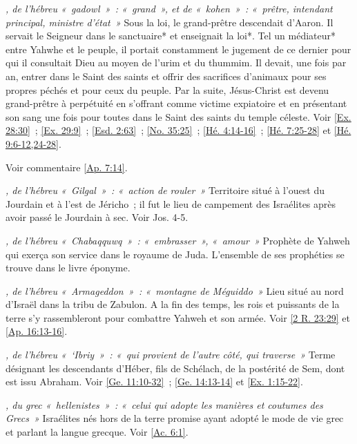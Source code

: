 \begin{multicols}{2}
\textit{, de l'hébreu «~gadowl~»~: «~grand~», et de «~kohen~»~: «~prêtre, intendant principal, ministre d'état~»}\newline
Sous la loi, le grand-prêtre descendait d'Aaron. Il servait le Seigneur dans le sanctuaire* et enseignait la loi*. Tel un médiateur* entre Yahwhe et le peuple, il portait constamment le jugement de ce dernier pour qui il consultait Dieu au moyen de l'urim et du thummim. Il devait, une fois par an, entrer dans le Saint des saints et offrir des sacrifices d'animaux pour ses propres péchés et pour ceux du peuple. Par la suite, Jésus-Christ est devenu grand-prêtre à perpétuité en s'offrant comme victime expiatoire et en présentant son sang une fois pour toutes dans le Saint des saints du temple céleste. Voir \vref{Ex. 28:30}~; \vref{Ex. 29:9}~; \vref{Esd. 2:63}~; \vref{No. 35:25}~; \vref{Hé. 4:14-16}~; \vref{Hé. 7:25-28} et \vref{Hé. 9:6-12,24-28}.

\textit{}\newline
Voir commentaire \vref{Ap. 7:14}.

\textit{, de l'hébreu «~Gilgal~»~: «~action de rouler~»}\newline
Territoire situé à l'ouest du Jourdain et à l'est de Jéricho~; il fut le lieu de campement des Israélites après avoir passé le Jourdain à sec. Voir Jos. 4-5.

\textit{, de l'hébreu «~Chabaqquwq~»~: «~embrasser~», «~amour~»}\newline
Prophète de Yahweh qui exerça son service dans le royaume de Juda. L'ensemble de ses prophéties se trouve dans le livre éponyme.

\textit{, de l'hébreu «~Armageddon~»~: «~montagne de Méguiddo~»}\newline
Lieu situé au nord d'Israël dans la tribu de Zabulon. A la fin des temps, les rois et puissants de la terre s'y rassembleront pour combattre Yahweh et son armée. Voir \vref{2 R. 23:29} et \vref{Ap. 16:13-16}.

\textit{, de l'hébreu «~`Ibriy~»~: «~qui provient de l'autre côté, qui traverse~»}\newline
Terme désignant les descendants d'Héber, fils de Schélach, de la postérité de Sem, dont est issu Abraham. Voir \vref{Ge. 11:10-32}~; \vref{Ge. 14:13-14} et \vref{Ex. 1:15-22}.

\textit{, du grec «~hellenistes~»~: «~celui qui adopte les manières et coutumes des Grecs~»}\newline
Israélites nés hors de la terre promise ayant adopté le mode de vie grec et parlant la langue grecque. Voir \vref{Ac. 6:1}.


\end{multicols}
